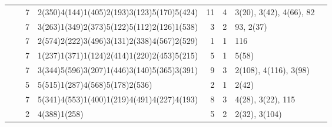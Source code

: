 \documentclass[]{article}
\begin{document}
\begin{longtable}{|c|c|rl|rrll|}
  &   &  7  &  2(350)4(144)1(405)2(193)3(123)5(170)5(424)  &  11  &  4 & 3(20), 3(42), 4(66), 82 & \\ 
  &   &  7  &  3(263)1(349)2(373)5(122)5(112)2(126)1(538)  &  3  &  2 & 93, 2(37) & \\ 
  &   &  7  &  2(574)2(222)3(496)3(131)2(338)4(567)2(529)  &  1  &  1 & 116 & \\ 
  &   &  7  &  1(237)1(371)1(124)2(414)1(220)2(453)5(215)  &  5  &  1 & 5(58) & \\ 
  &   &  7  &  3(344)5(596)3(207)1(446)3(140)5(365)3(391)  &  9  &  3 & 2(108), 4(116), 3(98) & \\ 
  &   &  5  &  5(515)1(287)4(568)5(178)2(536)  &  2  &  1 & 2(42) & \\ 
  &   &  7  &  5(341)4(553)1(400)1(219)4(491)4(227)4(193)  &  8  &  3 & 4(28), 3(22), 115 & \\ 
  &   &  2  &  4(388)1(258)  &  5  &  2 & 2(32), 3(104) & \\ 
\hline
   \end{longtable}
\end{document}
